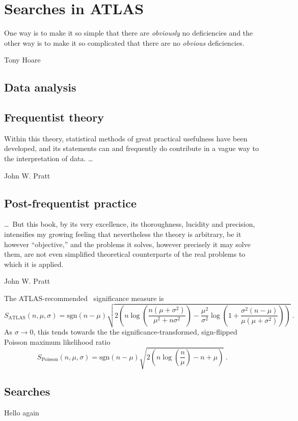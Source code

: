 \chapter{Searches in ATLAS}
\label{chapter:intro}

\epigraph{%
One way is to make it so simple that there are \emph{obviously} no deficiencies and the other way is to make it so complicated that there are
no \emph{obvious} deficiencies.%
}%
{Tony Hoare~\cite{hoare2007emperor}}



\section{Data analysis}

\section{Frequentist theory}

\epigraph{%
Within this theory, statistical methods of great practical usefulness have been
developed, and its statements can and frequently do contribute in a vague way
to the interpretation of data. \ldots%
}%
{John W. Pratt~\cite{pratt1961testing}}


\section{Post-frequentist practice}

\epigraph{%
\ldots\ But this book, by its very excellence, its thoroughness, lucidity and
precision, intensifies my growing feeling that nevertheless the theory is
arbitrary, be it however ``objective,'' and the problems it solves, however
precisely it may solve them, are not even simplified theoretical counterparts
of the real problems to which it is applied.%
}%
{John W. Pratt~\cite{pratt1961testing}}


The ATLAS-recommended~\cite{atlas_significance} significance measure is
\begin{equation}
\label{eqn:significance_atlas}
S_\mathrm{ATLAS}(n, \mu, \sigma)
= \mathrm{sgn}(n - \mu) \sqrt{2\left(
    n\log\left(\frac{n(\mu + \sigma^2)}{\mu^2 + n\sigma^2}\right)
    - \frac{\mu^2}{\sigma^2}\log\left(
        1 + \frac{\sigma^2(n - \mu)}{\mu(\mu + \sigma^2)}
    \right)
\right)}
~.
\end{equation}
As $\sigma \rightarrow 0$, this tends towards the the significance-transformed,
sign-flipped Poisson maximum likelihood ratio
\begin{equation}
S_\mathrm{Poisson}(n, \mu, \sigma)
= \mathrm{sgn}(n - \mu) \sqrt{2\left(
    n\log\left(\frac{n}{\mu}\right) - n + \mu
\right)}
~.
\end{equation}

\section{Searches}

\clearpage

Hello again
